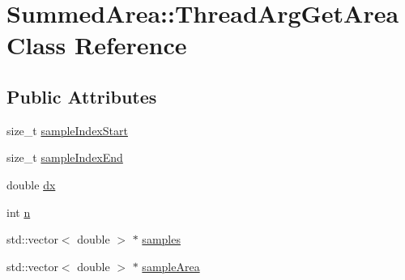 \hypertarget{classSummedArea_1_1ThreadArgGetArea}{\section{Summed\-Area\-:\-:Thread\-Arg\-Get\-Area Class Reference}
\label{classSummedArea_1_1ThreadArgGetArea}
}
\subsection*{Public Attributes}
\begin{DoxyCompactItemize}
\item 
size\-\_\-t \hyperlink{classSummedArea_1_1ThreadArgGetArea_af67fa94677c2947d70ba11a42b923d36}{sample\-Index\-Start}
\item 
size\-\_\-t \hyperlink{classSummedArea_1_1ThreadArgGetArea_ab0d261bfd483b3b5c790bcec68535e36}{sample\-Index\-End}
\item 
double \hyperlink{classSummedArea_1_1ThreadArgGetArea_a5c177ecad27b4a1bf6109bbc98f33bc3}{dx}
\item 
int \hyperlink{classSummedArea_1_1ThreadArgGetArea_a9f42d9e54909749f1e278e1954330d89}{n}
\item 
std\-::vector$<$ double $>$ $\ast$ \hyperlink{classSummedArea_1_1ThreadArgGetArea_ad37fc357e9602189579bfe9e352d4041}{samples}
\item 
std\-::vector$<$ double $>$ $\ast$ \hyperlink{classSummedArea_1_1ThreadArgGetArea_ae7740ca6e8e204044dedbdc9ce25fe97}{sample\-Area}
\end{DoxyCompactItemize}


